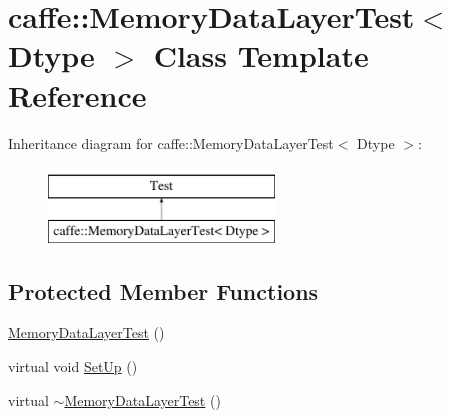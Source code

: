 \hypertarget{classcaffe_1_1_memory_data_layer_test}{\section{caffe\+:\+:Memory\+Data\+Layer\+Test$<$ Dtype $>$ Class Template Reference}
\label{classcaffe_1_1_memory_data_layer_test}
}
Inheritance diagram for caffe\+:\+:Memory\+Data\+Layer\+Test$<$ Dtype $>$\+:\begin{figure}[H]
\begin{center}
\leavevmode
\includegraphics[height=2.000000cm]{classcaffe_1_1_memory_data_layer_test}
\end{center}
\end{figure}
\subsection*{Protected Member Functions}
\begin{DoxyCompactItemize}
\item 
\hyperlink{classcaffe_1_1_memory_data_layer_test_a75d651c270984eb6146e5a00185a86cb}{Memory\+Data\+Layer\+Test} ()
\item 
virtual void \hyperlink{classcaffe_1_1_memory_data_layer_test_a22ac69a349db8a2316ab93baf83763a8}{Set\+Up} ()
\item 
virtual \hyperlink{classcaffe_1_1_memory_data_layer_test_aee42724e86e18c80fd912719e8bc8728}{$\sim$\+Memory\+Data\+Layer\+Test} ()
\end{DoxyCompactItemize}
